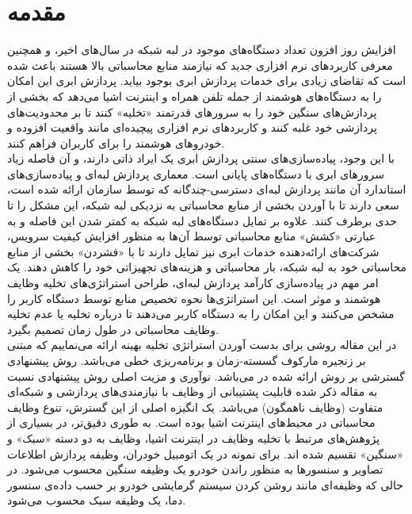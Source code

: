 \chapter{مقدمه} 
افزایش روز افزون تعداد دستگاه‌های موجود در لبه شبکه در سال‌های اخیر، و همچنین معرفی کاربردهای نرم افزاری جدید که نیازمند منابع محاسباتی بالا هستند باعث شده است که تقاضای زیادی برای خدمات پردازش ابری بوجود بیاید. پردازش ابری این امکان را به دستگاه‌های هوشمند از جمله تلفن همراه و اینترنت اشیا می‌دهد که بخشی از پردازش‌های سنگین خود را به سرورهای قدرتمند «تخلیه» کنند تا بر محدودیت‌های پردازشی خود غلبه کنند و کاربردهای نرم افزاری پیچیده‌ای مانند واقعیت افزوده و خودروهای هوشمند را برای کاربران فراهم کنند. \\

با این وجود، پیاده‌سازی‌های سنتی پردازش ابری یک ایراد ذاتی دارند، و آن فاصله زیاد سرورهای ابری با دستگاه‌های پایانی است. معماری پردازش لبه‌ای و پیاده‌سازی‌های استاندارد آن مانند پردازش لبه‌ای دسترسی-چندگانه که توسط سازمان  ارائه شده است، سعی دارند تا با آوردن بخشی از منابع محاسباتی به نزدیکی لبه شبکه، این مشکل را تا حدی برطرف کنند. علاوه بر تمایل دستگاه‌های لبه شبکه به کمتر شدن این فاصله و به عبارتی «کشش» منابع محاسباتی توسط آن‌ها به منظور افزایش کیفیت سرویس، شرکت‌های ارائه‌دهنده خدمات ابری نیز تمایل دارند تا با «فشردن» بخشی از منابع محاسباتی خود به لبه شبکه، بار محاسباتی و هزینه‌های تجهیزاتی خود را کاهش دهند. \cite{edgevisions}
\newpage
یک امر مهم در پیاده‌سازی کارآمد پردازش لبه‌ای، طراحی استراتژی‌های تخلیه وظایف هوشمند و موثر است. این استراتژی‌ها نحوه تخصیص منابع توسط دستگاه کاربر را مشخص می‌کنند و این امکان را به دستگاه کاربر می‌دهند تا درباره تخلیه یا عدم تخلیه وظایف محاسباتی در طول زمان تصمیم بگیرد. \\

در این مقاله روشی برای بدست آوردن استراتژی تخلیه بهینه ارائه می‌نماییم که مبتنی بر زنجیره مارکوف گسسته-زمان و برنامه‌ریزی خطی می‌باشد. روش پیشنهادی گسترشی بر روش ارائه شده در \cite{Liu} می‌باشد. نوآوری و مزیت اصلی روش پیشنهادی نسبت به مقاله ذکر شده قابلیت پشتیبانی از وظایف با نیازمندی‌های پردازشی و شبکه‌ای متفاوت (وظایف ناهمگون) می‌باشد. یک انگیزه اصلی از این گسترش، تنوع وظایف محاسباتی در محیط‌های اینترنت اشیا بوده است. به طوری دقیق‌تر، در بسیاری از پژوهش‌های مرتبط با تخلیه وظایف در اینترنت اشیا، وظایف به دو دسته «سبک» و «سنگین» تقسیم شده اند. \cite{yousefpour} \cite{tran} برای نمونه در یک اتومبیل خودران، وظیفه پردازش اطلاعات تصاویر و سنسورها به منظور راندن خودرو یک وظیفه سنگین محسوب می‌شود. در حالی که وظیفه‌ای مانند روشن کردن سیستم گرمایشی خودرو بر حسب داده‌ی سنسور دما، یک وظیفه سبک محسوب می‌شود. \\

